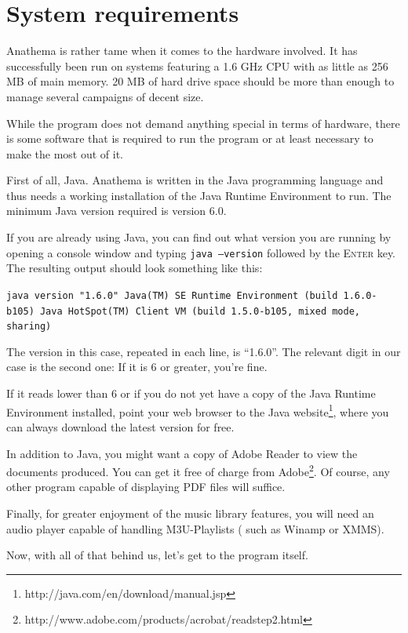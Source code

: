 \section{System requirements}
Anathema is rather tame when it comes to the hardware involved. It has successfully been run on systems featuring a 1.6 GHz CPU with as little as 256 MB of main memory. 20 MB of hard drive space should be more than enough to manage several campaigns of decent size.

While the program does not demand anything special in terms of hardware, there is some software that is required to run the program or at least necessary to make the most out of it.

First of all, Java. Anathema is written in the Java programming language and thus needs a working installation of the Java Runtime Environment to run. The minimum Java version required is version 6.0.

If you are already using Java, you can find out what version you are running by opening a console window and typing \texttt{java --version} followed by the \textsc{Enter} key. The resulting output should look something like this:
\medskip

\small
\texttt{java version "1.6.0"
\newline
Java(TM) SE Runtime Environment (build 1.6.0-b105)
\newline
Java HotSpot(TM) Client VM (build 1.5.0-b105, mixed mode, sharing)}
\medskip

\normalsize
The version in this case, repeated in each line, is ``1.6.0''. The relevant digit in our case is the second one: If it is 6 or greater, you're fine.

If it reads lower than 6 or if you do not yet have a copy of the Java Runtime Environment installed, point your web browser to the Java website\footnote{http://java.com/en/download/manual.jsp}, where you can always download the latest version for free.
\medskip

In addition to Java, you might want a copy of Adobe Reader to view the documents produced. You can get it free of charge from Adobe\footnote{http://www.adobe.com/products/acrobat/readstep2.html}. Of course, any other program capable of displaying PDF files will suffice.

Finally, for greater enjoyment of the music library features, you will need an audio player capable of handling M3U-Playlists ( such as Winamp or XMMS).
\medskip

Now, with all of that behind us, let's get to the program itself.



